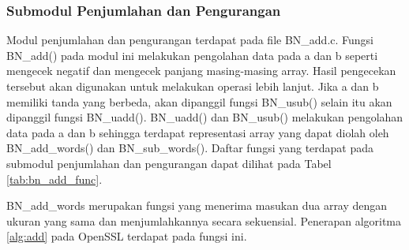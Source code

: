     \subsubsection{Submodul Penjumlahan dan Pengurangan}
      Modul penjumlahan dan pengurangan terdapat pada file BN\_add.c. Fungsi BN\_add() pada modul ini melakukan pengolahan data pada a dan b seperti mengecek negatif dan mengecek panjang masing-masing array. Hasil pengecekan tersebut akan digunakan untuk melakukan operasi lebih lanjut. Jika a dan b memiliki tanda yang berbeda, akan dipanggil fungsi BN\_usub() selain itu akan dipanggil fungsi BN\_uadd(). BN\_uadd() dan BN\_usub() melakukan pengolahan data pada a dan b sehingga terdapat representasi array yang dapat diolah oleh BN\_add\_words() dan BN\_sub\_words(). Daftar fungsi yang terdapat pada submodul penjumlahan dan pengurangan dapat dilihat pada Tabel \ref{tab:bn_add_func}.

      BN\_add\_words merupakan fungsi yang menerima masukan dua array dengan ukuran yang sama dan menjumlahkannya secara sekuensial. Penerapan algoritma \ref{alg:add} pada OpenSSL terdapat pada fungsi ini.

